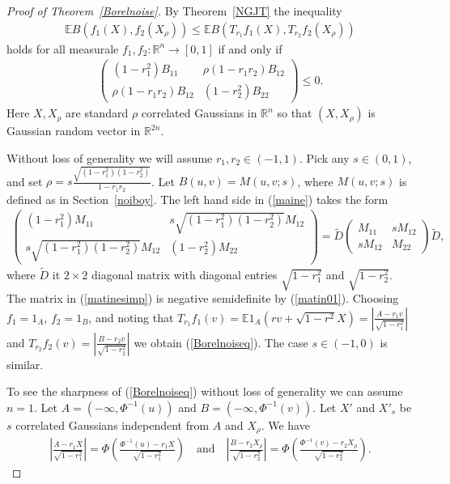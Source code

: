 \documentclass[9pt, a4paper]{amsart}
\newcommand{\1}{{\chi_{}}}%
\numberwithin{equation}{section}
\begin{document}
\begin{proof}[Proof of Theorem~\ref{Borelnoise}]
By Theorem~\ref{NGJT} the inequality 
\begin{align*}
  \mathbb{E} B(f_{1}(X), f_{2}(X_{\rho})) \leq  \mathbb{E} B(T_{r_{1}}f_{1}(X), T_{r_{2}}f_2(X_{\rho}))
\end{align*}
holds for all measurale $f_{1}, f_{2} :\mathbb{R}^{n} \to [0,1]$ if and only if 
\begin{align}\label{maine}
    \begin{pmatrix}
        (1-r_{1}^{2})B_{11} & \rho (1-r_{1}r_{2})B_{12} \\
        \rho (1-r_{1}r_{2})B_{12} & (1-r_{2}^{2})B_{22}
    \end{pmatrix} \leq 0.
\end{align}
 Here $X, X_{\rho}$ are standard $\rho$ correlated Gaussians in $\mathbb{R}^{n}$ so that $(X, X_{\rho})$ is  Gaussian random vector in $\mathbb{R}^{2n}$. 

 Without loss of generality we will assume $r_{1},r_{2} \in (-1,1)$. Pick any $s \in (0,1)$,  and set $\rho = s \frac{\sqrt{(1-r_{1}^{2})(1-r_{2}^{2})}}{1-r_{1}r_{2}}$.  Let $B(u,v)=M(u,v;s)$, where $M(u,v;s)$ is defined as in Section~\ref{noiboy}. The left hand side in (\ref{maine}) takes the form 
 \begin{align}\label{matinesimp}
        \begin{pmatrix}
        (1-r_{1}^{2})M_{11} &  s\sqrt{(1-r_{1}^{2})(1-r_{2}^{2})}M_{12} \\
         s\sqrt{(1-r_{1}^{2})(1-r_{2}^{2})}M_{12} & (1-r_{2}^{2})M_{22}
    \end{pmatrix} = \tilde{D} \begin{pmatrix}
        M_{11} &  sM_{12} \\
         sM_{12} & M_{22}
    \end{pmatrix}\tilde{D},
 \end{align}
 where $\tilde{D}$ it $2\times 2$ diagonal matrix with diagonal entries $\sqrt{1-r_{1}^{2}}$ and $\sqrt{1-r_{2}^{2}}$. The matrix in (\ref{matinesimp}) is negative semidefinite by  (\ref{matin01}). Choosing $f_{1} = {1}_{A}$,  $f_{2}=1_{B}$, and noting that $T_{r_{1}}f_{1}(v) =\mathbb{E} 1_{A}(rv+\sqrt{1-r^{2}}X) = \left| \frac{A-r_{1}v}{\sqrt{1-r_{1}^{2}}}\right|$ and $T_{r_{2}}f_{2}(v) = \left| \frac{B-r_{2}v}{\sqrt{1-r_{2}^{2}}}\right|$ we obtain (\ref{Borelnoiseq}). The case $s \in (-1,0)$ is similar. 

 To see the sharpness of (\ref{Borelnoiseq}) without loss of generality we can assume $n=1$. Let $A = (-\infty, \Phi^{-1}(u))$ and $B = (-\infty, \Phi^{-1}(v))$.  Let $X'$ and $X'_{s}$ be $s$ correlated Gaussians independent from $A$ and $X_{\rho}$. We have 
 \begin{align*}
     \left| \frac{A-r_{1}X}{\sqrt{1-r_{1}^{2}}}\right| = \Phi\left( \frac{\Phi^{-1}(u)-r_{1}X}{\sqrt{1-r_{1}^{2}}}\right) \quad \text{and} \quad 
     \left| \frac{B-r_{2}X_{\rho}}{\sqrt{1-r_{2}^{2}}}\right| = \Phi\left( \frac{\Phi^{-1}(v)-r_{2}X_{\rho}}{\sqrt{1-r_{2}^{2}}}\right).
 \end{align*}


\end{proof}
\end{document}
